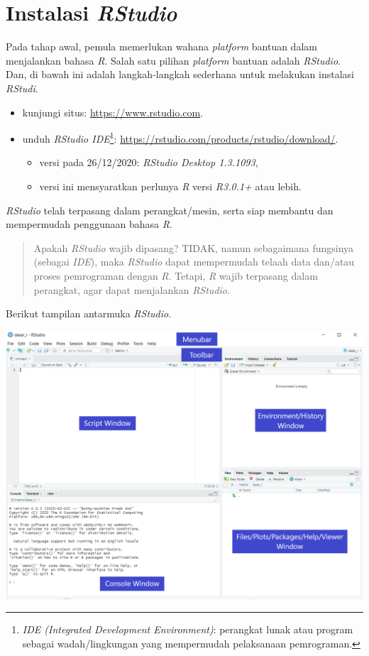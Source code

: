 \documentclass[
  12pt,
  a4paper,
]{scrbook}
\providecommand{\tightlist}{%
  \setlength{\itemsep}{0pt}\setlength{\parskip}{0pt}}
\begin{document}
\hypertarget{instalasi-rstudio}{%
\section{\texorpdfstring{Instalasi
\emph{RStudio}}{Instalasi RStudio}}\label{instalasi-rstudio}}

Pada tahap awal, pemula memerlukan wahana \emph{platform} bantuan dalam
menjalankan bahasa \emph{R}. Salah satu pilihan \emph{platform} bantuan
adalah \emph{RStudio}. Dan, di bawah ini adalah langkah-langkah
sederhana untuk melakukan instalasi \emph{RStudi}.

\begin{itemize}
\tightlist
\item
  kunjungi situs: \url{https://www.rstudio.com}.
\item
  unduh \emph{RStudio IDE}\footnote{\emph{IDE (Integrated Development
    Environment)}: perangkat lunak atau program sebagai wadah/lingkungan
    yang mempermudah pelaksanaan pemrograman.}:
  \url{https://rstudio.com/products/rstudio/download/}.

  \begin{itemize}
  \tightlist
  \item
    versi pada 26/12/2020: \emph{RStudio Desktop 1.3.1093},
  \item
    versi ini mensyaratkan perlunya \emph{R} versi \emph{R3.0.1+} atau
    lebih.
  \end{itemize}
\end{itemize}

\emph{RStudio} telah terpasang dalam perangkat/mesin, serta siap
membantu dan mempermudah penggunaan bahasa \emph{R}.

\begin{quote}
Apakah \emph{RStudio} wajib dipasang? TIDAK, namun sebagaimana fungsinya
(sebagai \emph{IDE}), maka \emph{RStudio} dapat mempermudah telaah data
dan/atau proses pemrograman dengan \emph{R}. Tetapi, \emph{R} wajib
terpasang dalam perangkat, agar dapat menjalankan \emph{RStudio}.
\end{quote}

Berikut tampilan antarmuka \emph{RStudio}.

\includegraphics{fig_rstudio.png}
\end{document}
